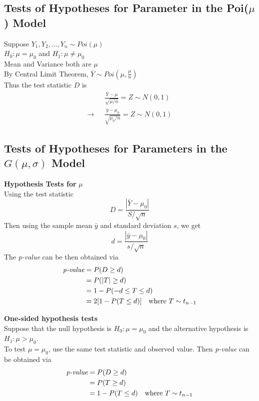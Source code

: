 \documentclass[12pt]{article}
\theoremstyle{definition}
\begin{document}
  \subsection{Tests of Hypotheses for Parameter in the Poi($\mu$) Model}
  Suppose $Y_{1}, Y_{2}, \dots, Y_{n} \sim Poi(\mu)$ \\
  $H_{0}: \mu = \mu_{0}$ and $H_{1}: \mu \not = \mu_{0}$ \\
  Mean and Variance both are $\mu$ \\
  By Central Limit Theorem, $\bar{Y} \sim Poi(\mu, \frac{\mu}{n})$ \\
  Thus the test statistic $D$ is
  \begin{align*}
  &\frac{\bar{Y} - \mu}{\sqrt{\mu / n}} = Z \sim N(0,1) \\
  \rightarrow~~~ &\frac{\bar{y} - \mu_{0}}{\sqrt{\mu_{0} / n}} = Z \sim N(0,1)
  \end{align*}

  \subsection{Tests of Hypotheses for Parameters in the $G(\mu, \sigma)$ Model}
  \textbf{Hypothesis Tests for} $\mu$ \\
  Using the test statistic
  $$D = \frac{|\bar{Y} - \mu_0|}{S/\sqrt{n}}$$
  Then using the sample mean $\bar{y}$ and standard deviation $s$, we get
  $$d = \frac{|\bar{y} - \mu_0|}{s/\sqrt{n}}$$
  The \emph{p-value} can be then obtained via
  \begin{align*}
    \emph{p-value} &= P(D \geq d) \\
    &= P(|T| \geq d) \\
    &= 1 - P(-d \leq T \leq d) \\
    &= 2[1 - P(T \leq d)] ~~~\text{where } T \sim t_{n-1}
  \end{align*}

  \textbf{One-sided hypothesis tests} \\
  Suppose that the null hypothesis is $H_{0} : \mu = \mu_{0}$ and the alternative hypothesis is $H_{1} : \mu > \mu_{0}$. \\
  To test $\mu = \mu_{0}$, use the same test statistic and observed value.
  Then \emph{p-value} can be obtained via
  \begin{align*}
    \emph{p-value} &= P(D \geq d) \\
    &= P(T \geq d) \\
    &= 1 - P(T \leq d) ~~~\text{where } T \sim t_{n-1}
  \end{align*}
\end{document}
